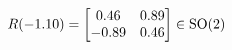 \documentclass[preview]{standalone}
\begin{document}
\begin{align*}
\special{dvisvgm:raw <g id='unique000'>}R(-1.10) = \begin{bmatrix} 0.46 & 0.89 \\ -0.89 & 0.46 \end{bmatrix} \in \text{SO}(2)\special{dvisvgm:raw </g>}
\end{align*}
\end{document}
